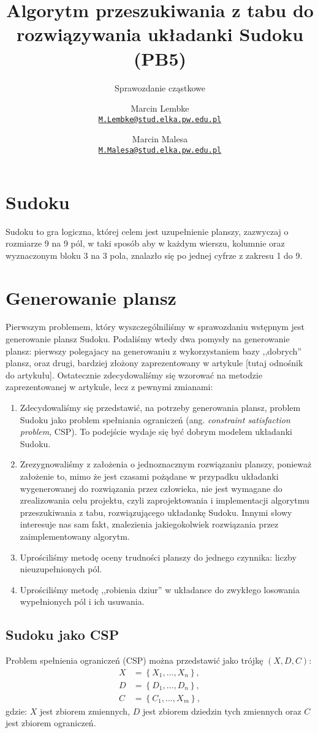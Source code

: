 \documentclass[]{project_report}
\author{%
	Marcin Lembke\\
	\texttt{\href{mailto:M.Lembke@stud.elka.pw.edu.pl}%
		{\nolinkurl{M.Lembke@stud.elka.pw.edu.pl}}}
	\and
	Marcin Malesa\\
	\texttt{\href{mailto:M.Malesa@stud.elka.pw.edu.pl}%
		{\nolinkurl{M.Malesa@stud.elka.pw.edu.pl}}}
}
\title{Algorytm przeszukiwania z tabu do rozwiązywania układanki Sudoku (PB5)}
\subtitle{Sprawozdanie cząstkowe}
\begin{document}
	\maketitle
	
	\section{Sudoku}
	Sudoku to gra logiczna, której celem jest uzupełnienie planszy, zazwyczaj o rozmiarze 9 na 9 pól, w taki sposób aby w każdym wierszu, kolumnie oraz wyznaczonym bloku 3 na 3 pola, znalazło się po jednej cyfrze z zakresu 1 do 9.
	
	\section{Generowanie plansz}
	Pierwszym problemem, który wyszczególniliśmy w sprawozdaniu wstępnym jest generowanie plansz Sudoku. Podaliśmy wtedy dwa pomysły na generowanie plansz: pierwszy polegajacy na generowaniu z wykorzystaniem bazy ,,dobrych'' plansz, oraz drugi, bardziej złożony zaprezentowany w artykule [tutaj odnośnik do artykułu].
	Ostatecznie zdecydowaliśmy się wzorować na metodzie zaprezentowanej w artykule, lecz z pewnymi zmianami:
	\begin{enumerate}
		\item Zdecydowaliśmy się przedstawić, na potrzeby generowania plansz, problem Sudoku jako problem spełniania ograniczeń (ang. \textit{constraint satisfaction problem}, CSP). To podejście wydaje się być dobrym modelem układanki Sudoku.
		\item Zrezygnowaliśmy z założenia o jednoznacznym rozwiązaniu planszy, ponieważ założenie to, mimo że jest czasami pożądane w przypadku układanki wygenerowanej do rozwiązania przez człowieka, nie jest wymagane do zrealizowania celu projektu, czyli zaprojektowania i implementacji algorytmu przeszukiwania z tabu, rozwiązującego układankę Sudoku. Innymi słowy interesuje nas sam fakt, znalezienia jakiegokolwiek rozwiązania przez zaimplementowany algorytm.
		\item Uprościliśmy metodę oceny trudności planszy do jednego czynnika: liczby nieuzupełnionych pól.
		\item Uprościliśmy metodę ,,robienia dziur'' w układance do zwykłego losowania wypełnionych pól i ich usuwania.
	\end{enumerate}
	\subsection{Sudoku jako CSP}
	Problem spełnienia ograniczeń (CSP) można przedstawić jako trójkę \((X , D, C)\):
	\begin{align*}
		X &= \left\lbrace X_{1}, \ldots, X_{n} \right\rbrace,\\
		D &= \left\lbrace D_{1}, \ldots, D_{n} \right\rbrace,\\
		C &= \left\lbrace C_{1}, \ldots, X_{m} \right\rbrace,
	\end{align*}
	gdzie: \(X\) jest zbiorem zmiennych, \(D\) jest zbiorem dziedzin tych zmiennych oraz \(C\) jest zbiorem ograniczeń.
	
\end{document}
